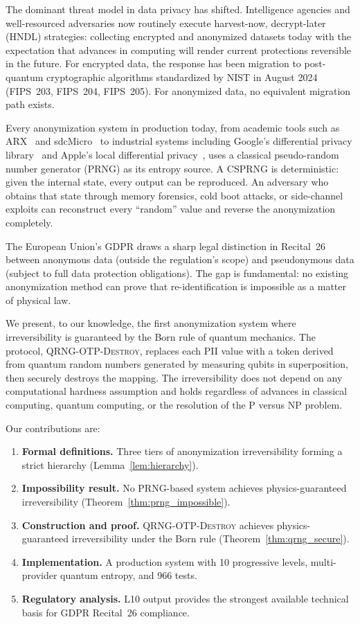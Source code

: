 \documentclass[acmsmall,screen,review,anonymous]{acmart}
\begin{document}
The dominant threat model in data privacy has shifted. Intelligence agencies and well-resourced adversaries now routinely execute harvest-now, decrypt-later (HNDL) strategies: collecting encrypted and anonymized datasets today with the expectation that advances in computing will render current protections reversible in the future. For encrypted data, the response has been migration to post-quantum cryptographic algorithms standardized by NIST in August 2024 (FIPS~203, FIPS~204, FIPS~205). For anonymized data, no equivalent migration path exists.

Every anonymization system in production today, from academic tools such as ARX~\cite{prasser2014arx} and sdcMicro~\cite{templ2017sdc} to industrial systems including Google's differential privacy library~\cite{wilson2020dpsql} and Apple's local differential privacy~\cite{apple2017dp}, uses a classical pseudo-random number generator (PRNG) as its entropy source. A CSPRNG is deterministic: given the internal state, every output can be reproduced. An adversary who obtains that state through memory forensics, cold boot attacks, or side-channel exploits can reconstruct every ``random'' value and reverse the anonymization completely.

The European Union's GDPR draws a sharp legal distinction in Recital~26 between anonymous data (outside the regulation's scope) and pseudonymous data (subject to full data protection obligations). The gap is fundamental: no existing anonymization method can prove that re-identification is impossible as a matter of physical law.

We present, to our knowledge, the first anonymization system where irreversibility is guaranteed by the Born rule of quantum mechanics. The protocol, \textsc{QRNG-OTP-Destroy}, replaces each PII value with a token derived from quantum random numbers generated by measuring qubits in superposition, then securely destroys the mapping. The irreversibility does not depend on any computational hardness assumption and holds regardless of advances in classical computing, quantum computing, or the resolution of the P versus NP problem.

Our contributions are:
\begin{enumerate}
\item \textbf{Formal definitions.} Three tiers of anonymization irreversibility forming a strict hierarchy (Lemma~\ref{lem:hierarchy}).
\item \textbf{Impossibility result.} No PRNG-based system achieves physics-guaranteed irreversibility (Theorem~\ref{thm:prng_impossible}).
\item \textbf{Construction and proof.} \textsc{QRNG-OTP-Destroy} achieves physics-guaranteed irreversibility under the Born rule (Theorem~\ref{thm:qrng_secure}).
\item \textbf{Implementation.} A production system with 10 progressive levels, multi-provider quantum entropy, and 966 tests.
\item \textbf{Regulatory analysis.} L10 output provides the strongest available technical basis for GDPR Recital~26 compliance.
\end{enumerate}
\end{document}
